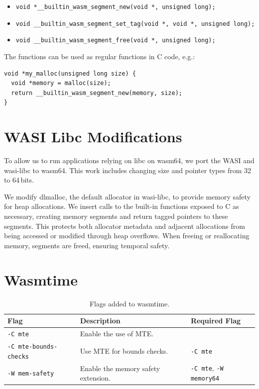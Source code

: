 \begin{itemize}
  \item \lstinline[style=customc]{void *__builtin_wasm_segment_new(void *, unsigned long);}
  \item \lstinline[style=customc]{void __builtin_wasm_segment_set_tag(void *, void *, unsigned long);}
  \item \lstinline[style=customc]{void __builtin_wasm_segment_free(void *, unsigned long);}
\end{itemize}

The functions can be used as regular functions in C code, e.g.:

\begin{lstlisting}[frame=h,style=customc,
  label={lst:builtin-functions}]
void *my_malloc(unsigned long size) {
  void *memory = malloc(size);
  return __builtin_wasm_segment_new(memory, size);
}
\end{lstlisting}

\section{WASI Libc Modifications}
\label{sec:wasi-libc}

To allow us to run applications relying on libc on wasm64, we port the \acf{WASI} and wasi-libc to wasm64.
This work includes changing size and pointer types from 32 to 64\,bits.

We modify dlmalloc, the default allocator in wasi-libc, to provide memory safety for heap allocations.
We insert calls to the built-in functions exposed to C as necessary, creating memory segments and return tagged pointers to these segments.
This protects both allocator metadata and adjacent allocations from being accessed or modified through heap overflows.
When freeing or reallocating memory, segments are freed, ensuring temporal safety.

\section{Wasmtime}
\label{sec:wasm-runtime}

\begin{table}[t]
  \centering
  \begin{tabular}{l | l | l}
    \textbf{Flag} & \textbf{Description} & \textbf{Required Flag} \\
    \hline
    \texttt{-C mte}               & Enable the use of \ac{MTE}. & \\
    \texttt{-C mte-bounds-checks} & Use \ac{MTE} for bounds checks. & \texttt{-C mte} \\
    \texttt{-W mem-safety}        & Enable the memory safety extension. & \texttt{-C mte}, \texttt{-W memory64} \\
  \end{tabular}
  \caption{Flags added to wasmtime.}
  \label{tab:wasmtime-flags}
\end{table}

